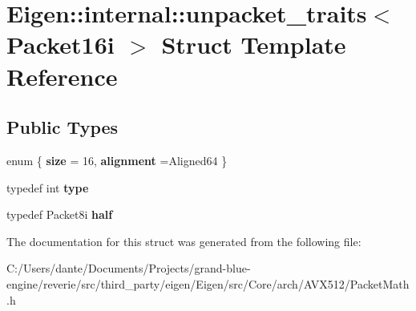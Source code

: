 \hypertarget{struct_eigen_1_1internal_1_1unpacket__traits_3_01_packet16i_01_4}{}\section{Eigen\+::internal\+::unpacket\+\_\+traits$<$ Packet16i $>$ Struct Template Reference}
\label{struct_eigen_1_1internal_1_1unpacket__traits_3_01_packet16i_01_4}
\subsection*{Public Types}
\begin{DoxyCompactItemize}
\item 
\mbox{\label{struct_eigen_1_1internal_1_1unpacket__traits_3_01_packet16i_01_4_abf75615b51da4c481b8412752a94040d}} 
enum \{ {\bfseries size} = 16, 
{\bfseries alignment} =Aligned64
 \}
\item 
\mbox{\label{struct_eigen_1_1internal_1_1unpacket__traits_3_01_packet16i_01_4_afcfe8934cc6b4045b413617dba1f2eee}} 
typedef int {\bfseries type}
\item 
\mbox{\label{struct_eigen_1_1internal_1_1unpacket__traits_3_01_packet16i_01_4_ac0780173c33ecd68c5f9e7281de93a25}} 
typedef Packet8i {\bfseries half}
\end{DoxyCompactItemize}


The documentation for this struct was generated from the following file\+:\begin{DoxyCompactItemize}
\item 
C\+:/\+Users/dante/\+Documents/\+Projects/grand-\/blue-\/engine/reverie/src/third\+\_\+party/eigen/\+Eigen/src/\+Core/arch/\+A\+V\+X512/Packet\+Math.\+h\end{DoxyCompactItemize}
